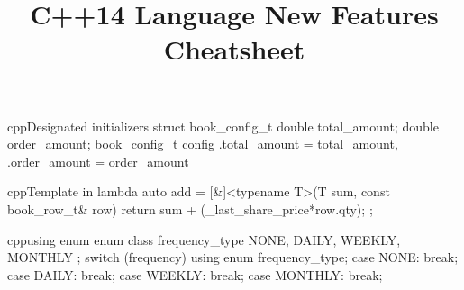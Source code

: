 \documentclass[10pt,a4paper]{article}
\title{\color{w3schools}C++14 Language New Features Cheatsheet
}
\begin{document}
\maketitle
\small
\begin{multicols}{3}

\thispagestyle{empty}
\scriptsize

% 




\begin{codebox}{cpp}{Designated initializers}
struct book_config_t {
  double total_amount;
  double order_amount;
}
book_config_t config {
 .total_amount = total_amount,
 .order_amount = order_amount
}

\end{codebox}

\begin{codebox}{cpp}{Template in lambda}
auto add = [&]<typename T>(T sum,
                           const book_row_t& row)
{ return sum + (_last_share_price*row.qty); };

\end{codebox}

\begin{codebox}{cpp}{using enum}
enum class frequency_type {
  NONE,
  DAILY,
  WEEKLY,
  MONTHLY
};
switch (frequency) {
  using enum frequency_type;
  {
    case NONE: break;
    case DAILY: break;
    case WEEKLY: break;
    case MONTHLY: break;
  }
}

\end{codebox}


\AtNextBibliography{\footnotesize}
\printbibliography  
\end{multicols}
\end{document}
